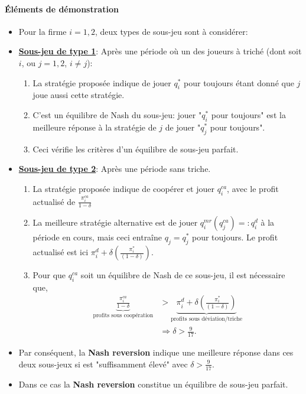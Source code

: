\begin{frame}[allowframebreaks]{\insertsection}
\framesubtitle{Éléments de démonstration}
\begin{itemize}
    \item Pour la firme $i=1, 2$, deux types de sous-jeu sont à considérer:
    \item \textbf{\underline{Sous-jeu de type 1}}:
    Après une période où un des joueurs à triché (dont soit $i$, ou $j=1, 2$, $i\neq j$):
    \begin{enumerate}[-]
        \item La stratégie proposée indique de jouer $q_i^*$ pour toujours étant donné que $j$ joue aussi 
        cette stratégie.  
        \item C'est un équilibre de Nash du sous-jeu: jouer "$q_i^*$ pour toujours" est la meilleure 
        réponse à la stratégie de $j$ de jouer "$q_j^*$ pour toujours".
        \item Ceci vérifie les critères d'un équilibre de sous-jeu parfait.
    \end{enumerate}
    \framebreak
    \item \textbf{\underline{Sous-jeu de type 2}}: Après une période sans triche.
    \begin{enumerate}[-]
        \item La stratégie proposée indique de coopérer et jouer $q_i^{ca}$, avec le profit actualisé de $\frac{\pi_i^{ca}}{1-\delta}$
        \item La meilleure stratégie alternative est de jouer $q_i^{mr}(q_j^{ca}) =: q_i^d$ à la période en cours,
         mais ceci entraîne $q_j =  q_j^*$ pour toujours. Le profit actualisé est ici 
         $\pi^d_i + \delta\left(\frac{\pi_i^*}{(1-\delta)}\right)$.
         \item Pour que $q_i^{ca}$ soit un équilibre de Nash de ce sous-jeu, il est nécessaire que,
         \begin{align*}
            \underbrace{\frac{\pi_i^{ca}}{1-\delta}}_{\text{profits sous coopération}} &> \underbrace{\pi^d_i + \delta\left(\frac{\pi_i^*}{(1-\delta)}\right)}_{\text{profits sous déviation/triche}}\\
            &\Rightarrow \delta >\frac{9}{17}.
         \end{align*}
    \end{enumerate}
    \item Par conséquent, la \textbf{Nash reversion} indique une meilleure réponse dans ces deux sous-jeux 
    si est "suffisamment élevé" avec $\delta >\frac{9}{17}$. 
    \item Dans ce cas la \textbf{Nash reversion} constitue un équilibre de sous-jeu parfait.
\end{itemize}

\end{frame}

